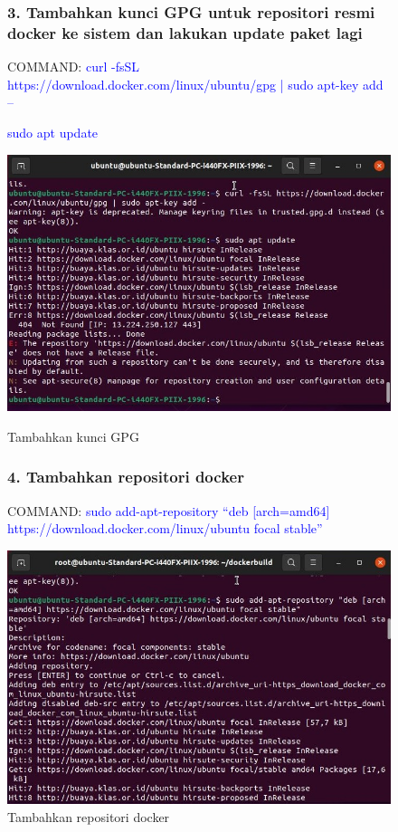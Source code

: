 \begin{figure}
\subsubsection{3. Tambahkan kunci GPG untuk repositori resmi docker ke sistem dan lakukan update paket lagi}
COMMAND: \textcolor{Blue}{curl -fsSL https://download.docker.com/linux/ubuntu/gpg | sudo apt-key add –}

\textcolor{Blue}{sudo apt update}
        \begin{center}
          \includegraphics[width=\linewidth]{image/4.jpg}
          \caption{Tambahkan kunci GPG}
          \label{fig:my_figure}
        \end{center}
\subsubsection{4. Tambahkan repositori docker }
COMMAND: \textcolor{Blue}{sudo add-apt-repository “deb [arch=amd64] https://download.docker.com/linux/ubuntu focal stable”}
        \begin{center}
          \includegraphics[width=\linewidth]{image/15.jpg}
          \caption{Tambahkan repositori docker}
          \label{fig:my_figure}
        \end{center}
\end{figure}

